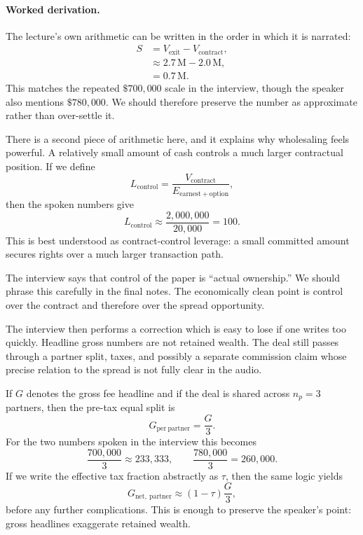 \paragraph{Worked derivation.}
The lecture's own arithmetic can be written in the order in which it is narrated:
\begin{align}
S &= V_{\mathrm{exit}} - V_{\mathrm{contract}},\\
&\approx 2.7\,\mathrm{M} - 2.0\,\mathrm{M},\\
&= 0.7\,\mathrm{M}.
\end{align}
This matches the repeated \(\$700{,}000\) scale in the interview, though the speaker also mentions \(\$780{,}000\). We should therefore preserve the number as approximate rather than over-settle it.

There is a second piece of arithmetic here, and it explains why wholesaling feels powerful. A relatively small amount of cash controls a much larger contractual position. If we define
\begin{equation}
L_{\mathrm{control}}=
\frac{V_{\mathrm{contract}}}{E_{\mathrm{earnest+option}}},
\end{equation}
then the spoken numbers give
\begin{equation}
L_{\mathrm{control}}
\approx
\frac{2{,}000{,}000}{20{,}000}
=100.
\end{equation}
This is best understood as contract-control leverage: a small committed amount secures rights over a much larger transaction path.

\begin{remark}
The interview says that control of the paper is ``actual ownership.'' We should phrase this carefully in the final notes. The economically clean point is control over the contract and therefore over the spread opportunity.
\end{remark}

The interview then performs a correction which is easy to lose if one writes too quickly. Headline gross numbers are not retained wealth. The deal still passes through a partner split, taxes, and possibly a separate commission claim whose precise relation to the spread is not fully clear in the audio.

If \(G\) denotes the gross fee headline and if the deal is shared across \(n_p=3\) partners, then the pre-tax equal split is
\begin{equation}
G_{\mathrm{per\ partner}} = \frac{G}{3}.
\end{equation}
For the two numbers spoken in the interview this becomes
\begin{equation}
\frac{700{,}000}{3}\approx 233{,}333,
\qquad
\frac{780{,}000}{3}=260{,}000.
\end{equation}
If we write the effective tax fraction abstractly as \(\tau\), then the same logic yields
\begin{equation}
G_{\mathrm{net,\ partner}} \approx (1-\tau)\frac{G}{3},
\end{equation}
before any further complications. This is enough to preserve the speaker's point: gross headlines exaggerate retained wealth.

